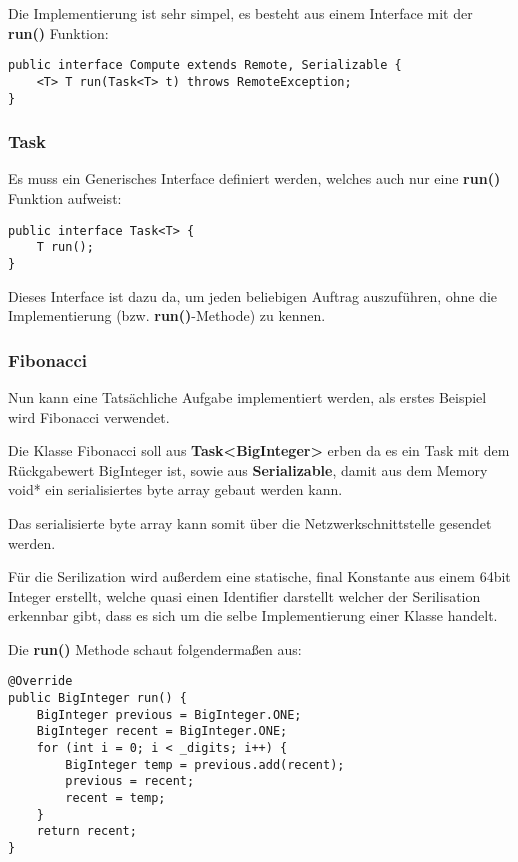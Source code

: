 Die Implementierung ist sehr simpel, es besteht aus einem Interface mit der \textbf{run()} Funktion:

\begin{lstlisting}[style=Java, caption=Module Implementation - Compute interface]
public interface Compute extends Remote, Serializable {
    <T> T run(Task<T> t) throws RemoteException;
}
\end{lstlisting}

\subsubsection{Task}
Es muss ein Generisches Interface definiert werden, welches auch nur eine \textbf{run()} Funktion aufweist:

\begin{lstlisting}[style=Java, caption=Module Implementation - Task interface]
public interface Task<T> {
	T run();
}
\end{lstlisting}

Dieses Interface ist dazu da, um jeden beliebigen Auftrag auszuführen, ohne die Implementierung (bzw. \textbf{run()}-Methode) zu kennen.

\subsubsection{Fibonacci}
Nun kann eine Tatsächliche Aufgabe implementiert werden, als erstes Beispiel wird Fibonacci verwendet.

Die Klasse Fibonacci soll aus \textbf{Task<BigInteger>} erben da es ein Task mit dem Rückgabewert BigInteger ist, sowie aus \textbf{Serializable}, damit aus dem Memory void* ein serialisiertes byte array gebaut werden kann.

Das serialisierte byte array kann somit über die Netzwerkschnittstelle gesendet werden.

Für die Serilization wird außerdem eine statische, final Konstante aus einem 64bit Integer erstellt, welche quasi einen Identifier darstellt welcher der Serilisation erkennbar gibt, dass es sich um die selbe Implementierung einer Klasse handelt.

Die \textbf{run()} Methode schaut folgendermaßen aus:

\begin{lstlisting}[style=Java, caption=Module Implementation - Fibonacci run]
@Override
public BigInteger run() {
	BigInteger previous = BigInteger.ONE;
    BigInteger recent = BigInteger.ONE;
    for (int i = 0; i < _digits; i++) {
    	BigInteger temp = previous.add(recent);
        previous = recent;
        recent = temp;
	}
	return recent;
}
\end{lstlisting}


